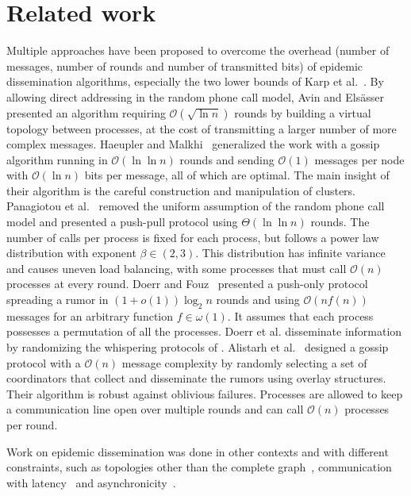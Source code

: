 \section{Related work}
\label{sec:epidemics}

Multiple approaches have been proposed to overcome the overhead (number of messages, 
number of rounds and number of transmitted bits) of epidemic dissemination algorithms, especially the two lower bounds of Karp et al.~\cite{DBLP:conf/focs/KarpSSV00}. By allowing direct addressing in the random phone call model, Avin and Elsässer~\cite{avin2013faster} presented an algorithm requiring $\mathcal{O}(\sqrt{\ln n})$ rounds by building
a virtual topology between processes, at the cost of transmitting a larger number of more complex
messages. Haeupler and Malkhi~\cite{haeupler2014optimal} generalized the work with a gossip algorithm running
in $\mathcal{O}(\ln \ln n)$ rounds and sending $\mathcal{O}(1)$ messages per node with $\mathcal{O}(\ln n)$
bits per message, all of which are optimal. The main insight of their algorithm is the careful construction and
manipulation of clusters. Panagiotou et al.~\cite{panagiotou2013faster} removed the uniform
assumption of the random phone call model and presented a push-pull protocol using $\Theta(\ln \ln n)$
rounds. The number of calls per process is fixed for each process, but follows a power law distribution with
exponent $\beta \in (2, 3)$. This distribution has infinite variance and causes uneven load balancing, with
some processes that must call $\mathcal{O}(n)$ processes at every round. Doerr and
Fouz~\cite{doerr2011asymptotically} presented a push-only protocol spreading a rumor in $(1 + o(1))\log_2 n$
rounds and using $\mathcal{O}(nf(n))$ messages for an arbitrary function $f \in \omega(1)$. It assumes that each process possesses a permutation of all the processes. Doerr et al. \cite{doerr2016simple} disseminate information by randomizing the whispering protocols of \cite{Gasieniec96adaptivebroadcasting,Diks2000}.  Alistarh et al.~\cite{DBLP:conf/icalp/AlistarhGGZ10} designed a gossip protocol with a $\mathcal{O}(n)$ message complexity by randomly selecting a set of coordinators that collect and disseminate the rumors using overlay structures. Their algorithm is robust against oblivious failures. Processes are allowed to keep a communication line open over multiple rounds and can call $\mathcal{O}(n)$ processes per round.

Work on epidemic dissemination was done in other contexts and with different constraints, such as topologies other than the complete graph~\cite{fountoulakis2010rumor,DBLP:conf/stacs/Giakkoupis11}, communication with latency~\cite{DBLP:conf/podc/GilbertRS17} and asynchronicity~\cite{acan2015push}. 
